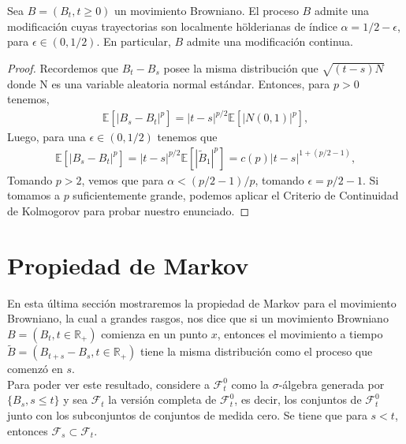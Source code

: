 \begin{corollary}
Sea $B = (B_t, t \geq 0)$ un movimiento Browniano. El proceso $B$ admite una modificación cuyas trayectorias son localmente hölderianas de índice $\alpha = 1/2 - \epsilon$, para $\epsilon \in (0, 1/2)$. En particular, $B$ admite una modificación continua.
\end{corollary}
\begin{proof}
Recordemos que $B_t - B_s$ posee la misma distribución que $\sqrt{(t - s) N}$ donde N es una variable aleatoria normal estándar. Entonces, para $p > 0$ tenemos,
\begin{align*}
	\mathbb{E} \left[ |B_s - B_t|^p \right] = |t-s|^{p/2} \mathbb{E} \left[ |N(0, 1)|^p \right],
	\end{align*}
Luego, para una $\epsilon \in (0, 1/2)$ tenemos que 
	\begin{align*}
	\mathbb{E} \left[ |B_s - B_t|^p \right] = |t-s|^{p/2} \mathbb{E} \left[ |\tilde{B}_{1}|^p \right] = c(p) |t-s|^{1 + (p/2 -1)},
\end{align*}
Tomando $p > 2$, vemos que para $\alpha < (p/2 - 1)/p$, tomando $\epsilon = p/2 - 1$. Si tomamos a $p$ suficientemente grande, podemos aplicar el Criterio de Continuidad de Kolmogorov para probar nuestro enunciado.
\end{proof}

\section{Propiedad de Markov}
En esta última sección mostraremos la propiedad de Markov para el movimiento Browniano, la cual a grandes rasgos, nos dice que si un movimiento Browniano $B = (B_t, t \in \mathbb{R}_{+})$ comienza en un punto $x$, entonces el movimiento a tiempo $\tilde{B} = (B_{t+s} - B_s, t \in \mathbb{R}_{+})$ tiene la misma distribución como el proceso que comenzó en $s$. \\

Para poder ver este resultado, considere a $\mathcal{F}_t^0$ como la $\sigma$-álgebra generada por $\{ B_s, s \leq t \}$ y sea $\mathcal{F}_t$ la versión completa de $\mathcal{F}_t^0$, es decir, los conjuntos de $\mathcal{F}_t^0$ junto con los subconjuntos de conjuntos de medida cero. Se tiene que para $s < t$, entonces $\mathcal{F}_s \subset \mathcal{F}_t$. \\

